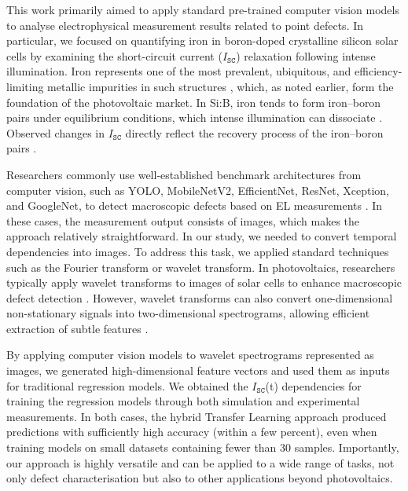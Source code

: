 \documentclass[10pt]{iopart}
\begin{document}
This work primarily aimed to apply standard pre-trained computer vision models to analyse electrophysical measurement results related to point defects. 
In particular, we focused on quantifying iron in boron-doped crystalline silicon solar cells by examining the short-circuit current ($I_\mathtt{SC}$) relaxation following intense illumination. 
Iron represents one of the most prevalent, ubiquitous, and efficiency-limiting metallic impurities in such structures \cite{Buonassisi2006, IronSC}, which, as noted earlier, form the foundation of the photovoltaic market. 
In Si:B, iron tends to form iron–boron pairs under equilibrium conditions, which intense illumination can dissociate \cite{Kimerling1983, FeBAssJAP2014}. 
Observed changes in $I_\mathtt{SC}$ directly reflect the recovery process of the iron–boron pairs \cite{Olikh2021JAP}.


Researchers commonly use well-established benchmark architectures from computer vision, such as YOLO, MobileNetV2, EfficientNet, ResNet, Xception, and GoogleNet, to detect macroscopic defects based on EL measurements \cite{Liu2024a, Li2024a, Jia2024, Otamendi2021, Chen2022, AlOtum2024, Abdelsattar2025, Tella2025}. 
In these cases, the measurement output consists of images, which makes the approach relatively straightforward. 
In our study, we needed to convert temporal dependencies into images. 
To address this task, we applied standard techniques such as the Fourier transform or wavelet transform. 
In photovoltaics, researchers typically apply wavelet transforms to images of solar cells to enhance macroscopic defect detection \cite{Li2012, Rosa2024}. 
However, wavelet transforms can also convert one-dimensional non-stationary signals into two-dimensional spectrograms, allowing efficient extraction of subtle features \cite{Vinit2020}.


By applying computer vision models to wavelet spectrograms represented as images, we generated high-dimensional feature vectors and used them as inputs for traditional regression models. 
We obtained the $I_\mathtt{SC}$(t) dependencies for training the regression models through both simulation and experimental measurements. 
In both cases, the hybrid Transfer Learning approach produced predictions with sufficiently high accuracy (within a few percent), even when training models on small datasets containing fewer than 30 samples. 
Importantly, our approach is highly versatile and can be applied to a wide range of tasks, not only defect characterisation but also to other applications beyond photovoltaics.
\end{document}
